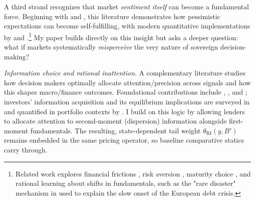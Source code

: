 \documentclass[12pt]{article}
\theoremstyle{plain}
\begin{document}
A third strand recognizes that market \textit{sentiment itself} can become a
fundamental force. Beginning with \citet{CalvoLeidermanReinhart1996} and
\citet{ColeKehoe2000}, this literature demonstrates how pessimistic
expectations can become self-fulfilling, with modern quantitative
implementations by \citet{GennaioliMartinRossi2014} and
\citet{BocolaDovis2019}.\footnote{Related work explores financial frictions
	\citet{LongstaffPanPedersenSingleton2011}, risk aversion \citet{Lizarazo2013},
	maturity choice \citet{Stangebye2020}, and rational learning about shifts in
	fundamentals, such as the "rare disaster" mechanism in \citet{Paluszynski2023}
	used to explain the slow onset of the European debt crisis.} My paper builds
directly on this insight but asks a deeper question: what if markets
systematically \emph{misperceive} the very nature of sovereign decision-making?

\noindent\textit{Information choice and rational inattention.} A complementary literature studies how decision makers optimally allocate attention/precision across signals and how this shapes macro/finance outcomes. Foundational contributions include \citet{Sims2003}, \citet{MackowiakWiederholt2009}, and \citet{MatejkaMcKay2015}; investors’ information acquisition and its equilibrium implications are surveyed in \citet{Veldkamp2011} and quantified in portfolio contexts by \citet{VanNieuwerburghVeldkamp2009}. I build on this logic by allowing lenders to allocate attention to second-moment (dispersion) information alongside first-moment fundamentals. The resulting, state-dependent tail weight $\theta_{\mathrm{RI}}(y,B')$ remains embedded in the same pricing operator, so baseline comparative statics carry through.
\end{document}
